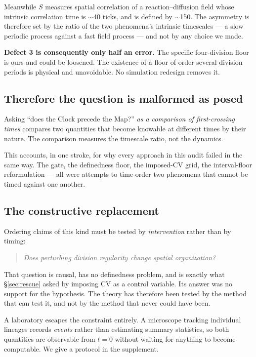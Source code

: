 \documentclass[11pt,letterpaper]{article}
\begin{document}
Meanwhile $S$ measures spatial correlation of a reaction--diffusion
field whose intrinsic correlation time is $\sim$40 ticks, and is
defined by $\sim$150. The asymmetry is therefore set by the ratio of
the two phenomena's intrinsic timescales --- a slow periodic process
against a fast field process --- and not by any choice we made.

\textbf{Defect 3 is consequently only half an error.} The specific
four-division floor is ours and could be loosened. The existence of a
floor of order several division periods is physical and unavoidable. No
simulation redesign removes it.

\subsection{Therefore the question is malformed as posed}

Asking ``does the Clock precede the Map?'' \emph{as a comparison of
first-crossing times} compares two quantities that become knowable at
different times by their nature. The comparison measures the timescale
ratio, not the dynamics.

This accounts, in one stroke, for why every approach in this audit
failed in the same way. The gate, the definedness floor, the imposed-CV
grid, the interval-floor reformulation --- all were attempts to
time-order two phenomena that cannot be timed against one another.

\subsection{The constructive replacement}

Ordering claims of this kind must be tested by \emph{intervention}
rather than by timing:

\begin{quote}
\emph{Does perturbing division regularity change spatial
organization?}
\end{quote}

That question is causal, has no definedness problem, and is exactly what
\S\ref{sec:rescue} asked by imposing CV as a control variable. Its answer
was no support for the hypothesis. The theory has therefore been tested
by the method that can test it, and not by the method that never could
have been.

A laboratory escapes the constraint entirely. A microscope tracking
individual lineages records \emph{events} rather than estimating
summary statistics, so both quantities are observable from $t = 0$
without waiting for anything to become computable. We give a protocol
in the supplement.
\end{document}
